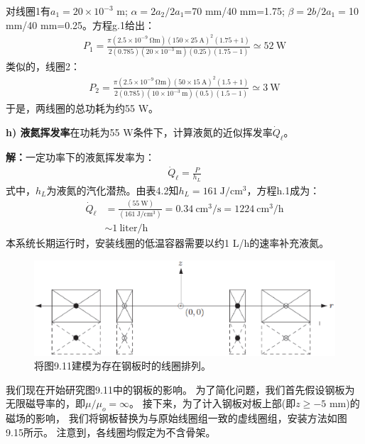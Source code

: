 对线圈1有$a_1=20\times 10^{-3}$ m; $\alpha=2a_2/2a_1$=70 mm/40 mm=1.75;
$\beta=2b/2a_1=$10 mm/40 mm=0.25。方程g.1给出：
\begin{align*}%
P_1=\frac{\pi(2.5\times 10^{-9}\ \mathrm{\Omega m})(150\times 25\ \mathrm{A})^2(1.75+1)}{2(0.785)(20\times 10^{-3}\ \mathrm{m})(0.25)(1.75-1)}\simeq 52\ \mathrm{W}
\end{align*}
类似的，线圈2：
\begin{align*}%
P_2=\frac{\pi(2.5\times 10^{-9}\ \mathrm{\Omega m})(50\times 15\ \mathrm{A})^2(1.5+1)}{2(0.785)(10\times 10^{-3}\ \mathrm{m})(0.5)(1.5-1)}\simeq 3\ \mathrm{W}
\end{align*}
于是，两线圈的总功耗为约55 W。

\textbf{h) 液氮挥发率}\qquad 在功耗为55 W条件下，计算液氮的近似挥发率$\dot{Q}_\ell$。

\textbf{解：}一定功率下的液氮挥发率为：
\begin{align*}%
\dot{Q}_\ell=\frac{P}{h_L} \tag{h.1}
\end{align*}
式中，$h_L$为液氮的汽化潜热。由表4.2知$h_L=161\ \mathrm{J/cm^3}$，方程h.1成为：
\begin{align*}%
\dot{Q}_\ell&=\frac{(55\ \mathrm{W})}{(161\ \mathrm{J/cm^3})}=0.34\ \mathrm{cm^3/s}=1224\ \mathrm{cm^3/h} \\
&\sim 1\ \mathrm{liter/h}
\end{align*}
本系统长期运行时，安装线圈的低温容器需要以约1 L/h的速率补充液氮。

\begin{figure}
	\centering
	\includegraphics[scale=0.6]{chpt9/figs/fig9.15.eps}
	\caption{将图9.11建模为存在钢板时的线圈排列。}
\end{figure}

我们现在开始研究图9.11中的钢板的影响。
为了简化问题，我们首先假设钢板为无限磁导率的，即$\mu/\mu_o=\infty$。
接下来，为了计入钢板对板上部(即$z\ge-5$ mm)的磁场的影响，
我们将钢板替换为与原始线圈组一致的虚线圈组，安装方法如图9.15所示。
注意到，各线圈均假定为不含骨架。

